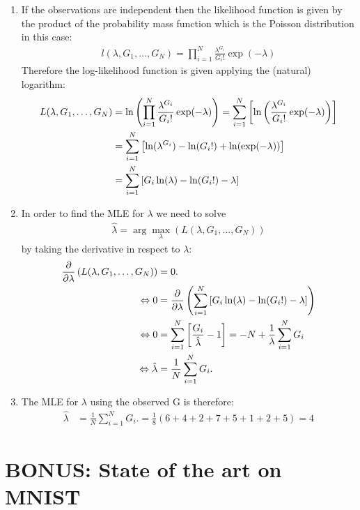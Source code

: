 \documentclass[12pt]{article}
\begin{document}
\begin{enumerate}
	\item If the observations are independent then the likelihood function is given by the product of the probability mass function which is the Poisson distribution in this case:
	\begin{align}
		l(\lambda, G_1,\dots, G_N)=\prod_{i=1}^{N}\frac{\lambda^{G_i}}{G_i!}\exp(-\lambda)
	\end{align}
	Therefore the log-likelihood function is given applying the (natural) logarithm:
	\begin{align}
		L(\lambda, G_1,\dots, G_N)&= \ln\left( \prod_{i=1}^{N}\frac{\lambda^{G_i}}{G_i!}\exp(-\lambda)  \right)= \sum_{i=1}^{N}\left[ \ln\left( \frac{\lambda^{G_i}}{G_i!}\exp(-\lambda) \right) \right] \notag \\
		&= \sum_{i=1}^{N}\left[  \ln(\lambda^{G_i})-\ln(G_i!)+\ln(\exp(-\lambda)) \right] \notag \\
		&= \sum_{i=1}^{N}\left[  G_i\ln(\lambda)-\ln(G_i!)-\lambda\right]
	\end{align}
	\item In order to find the MLE for $\lambda$ we need to solve
	\begin{align}
		\hat{\lambda}=\arg\max_\lambda(L(\lambda, G_1,\dots, G_N))
	\end{align}
	by taking the derivative in respect to $\lambda$:
	\begin{align}
		\frac{\partial}{\partial\lambda}\left( L(\lambda, G_1,\dots, G_N) \right) &= 0. \\ \notag
		\Leftrightarrow
		0 &= \frac{\partial}{\partial\lambda}\left(\sum_{i=1}^{N}\left[  G_i\ln(\lambda)-\ln(G_i!)-\lambda\right]  \right) \notag \\
		\Leftrightarrow
		0 &= \sum_{i=1}^{N}\left[  \frac{G_i}{\hat{\lambda}}-1\right] = -N + \frac{1}{\lambda}\sum_{i=1}^{N}G_i \notag \\
		\Leftrightarrow
		\hat{\lambda} &= \frac{1}{N}\sum_{i=1}^{N}G_i. 
	\end{align}
	\item The MLE for $\lambda$ using the observed G is therefore:
	\begin{align}
		\hat{\lambda} &= \frac{1}{N}\sum_{i=1}^{N}G_i. = \frac{1}{8}\left( 6+4+2+7+5+1+2+5 \right) = 4
	\end{align}
	
\end{enumerate}

\section{BONUS: State of the art on MNIST}
\end{document}
